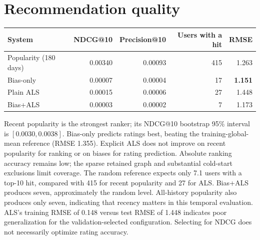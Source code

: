 \documentclass[10pt,a4paper]{article}
\begin{document}
\section*{Recommendation quality}
\begin{center}
\begin{tabular}{lrrrr}
\toprule
System & NDCG@10 & Precision@10 & Users with a hit & RMSE \\
\midrule
Popularity (180 days) & 0.00340 & 0.00093 & 415 & 1.263 \\
Bias-only             & 0.00007 & 0.00004 & 17  & \textbf{1.151} \\
Plain ALS             & 0.00015 & 0.00006 & 27  & 1.448 \\
Bias+ALS              & 0.00003 & 0.00002 & 7   & 1.173 \\
\bottomrule
\end{tabular}
\end{center}
Recent popularity is the strongest ranker; its NDCG@10 bootstrap 95\% interval
is $[0.0030,0.0038]$. Bias-only predicts ratings best, beating the training-global-mean
reference (RMSE 1.355). Explicit ALS does not improve on recent popularity for
ranking or on biases for rating prediction. Absolute ranking accuracy remains low;
the sparse retained graph and substantial cold-start exclusions limit coverage.
The random reference expects only 7.1 users with a top-10 hit, compared with 415
for recent popularity and 27 for ALS. Bias+ALS produces seven, approximately the
random level. All-history popularity also produces only seven, indicating that
recency matters in this temporal evaluation. ALS's training RMSE of 0.148 versus
test RMSE of 1.448 indicates poor generalization for the validation-selected
configuration. Selecting for NDCG does not necessarily optimize rating accuracy.
\end{document}
